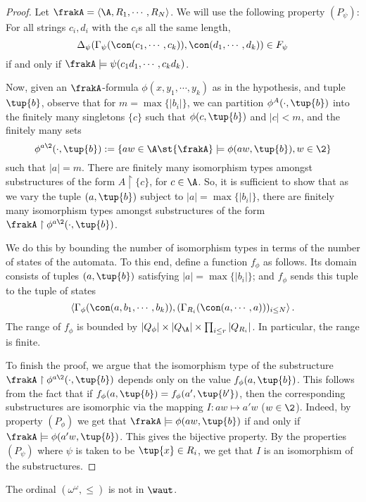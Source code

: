 \begin{proof}
Let $\frakA = \left<\A, R_1,\cdots,R_N\right>$. We will use the following property $(P_{\psi})$:
For all strings $c_i,d_i$ with the $c_i$s all the same length,
$$
\Delta_\psi(\Gamma_\psi(\con(c_1,\cdots,c_k)),\con(d_1,\cdots,d_k)) \in F_\psi
$$
if and only if $\frakA \models \psi(c_1d_1,\cdots,c_kd_k)$.

Now, given an $\frakA$-formula $\phi(x,y_1,\cdots,y_k)$ as in the hypothesis,
and tuple $\tup{b}$,
observe that for $m = \max\{|b_i|\}$, we can partition $\phi^{{A}}(\cdot,\tup{b})$
into the finitely many singletons $\{c\}$ such that $\phi(c,\tup{b})$ and  $|c| <
m$, and the finitely many sets 
\[
\phi^{a \2}(\cdot,\tup{b}) := \{aw \in \A \st {\frakA} \models \phi(aw,\tup{b}), w \in \2\}
\]
such that $|a| = m$. There are finitely
many isomorphism types amongst substructures of the form ${A} \restriction
\{c\}$, for $c \in \A$. So, it is sufficient to show that as we vary the tuple
$(a,\tup{b})$ subject to $|a| = \max\{|b_i|\}$, there are finitely many isomorphism
types amongst substructures of the form $\frakA \restriction \phi^{a \2}(\cdot,\tup{b})$.

We do this by bounding the number of isomorphism types in terms of the number
of states of the automata. To this end, define a function $f_\phi$ as
follows. Its domain consists of tuples $(a,\tup{b})$ satisfying $|a| =
\max\{|b_i|\}$; and $f_\phi$ sends this tuple to the tuple of states
$$
\left<\Gamma_\phi(\con(a,b_1,\cdots,b_k)),
(\Gamma_{R_i}(\con(a, \cdots, a)))_{i\leq N}\right>.
$$
The range of $f_\phi$ is bounded by $|Q_\phi| \times |Q_\A| \times \prod_{i
\leq r} |Q_{R_i}|$. In particular, the range is finite.

To finish the proof, we argue that the isomorphism type of the
substructure $\frakA \restriction \phi^{a \2}(\cdot,\tup{b})$ depends
only on the value $f_\phi(a,\tup{b})$. This follows from the fact that if
$f_\phi(a,\tup{b}) = f_\phi(a',\tup{b'})$, then the corresponding substructures
are isomorphic via the mapping $I:aw \mapsto a'w$ ($w \in \2$).
Indeed, by property $(P_\phi)$ we get that $\frakA \models \phi(aw,\tup{b})$ if and only if $\frakA \models \phi(a'w,\tup{b})$.  This gives the bijective property.
By the properties $(P_\psi)$ where $\psi$ is taken to be
$\tup{x} \in R_i$, we get that $I$ is an isomorphism of the substructures.
\end{proof}


\begin{corollary}  \label{cor:omegaomega}
The ordinal $(\omega^\omega,\leq)$ is not in $\waut$.
\end{corollary}


